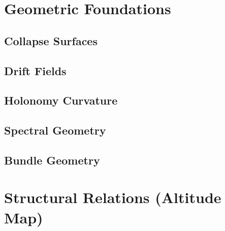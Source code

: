 \begin{axiom}
\end{axiom}



\section{Geometric Foundations}
\subsection{Collapse Surfaces}
\begin{definition}
\end{definition}

\subsection{Drift Fields}
\begin{definition}
\end{definition}

\subsection{Holonomy Curvature}
\begin{definition}
\end{definition}

\subsection{Spectral Geometry}
\begin{definition}
\end{definition}

\subsection{Bundle Geometry}
\begin{definition}
\end{definition}



\section{Structural Relations (Altitude Map)}
